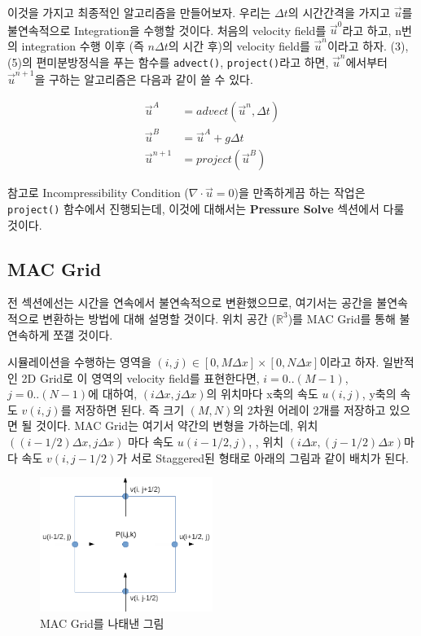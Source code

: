 \documentclass[12pt, A4]{article}
\begin{document}
이것을 가지고 최종적인 알고리즘을 만들어보자.
우리는 $\Delta t$의 시간간격을 가지고 $\vec{u}$를 불연속적으로 Integration을 수행할 것이다. 처음의 velocity field를 $\vec{u}^0$라고 하고, n번의 integration 수행 이후 (즉 $n \Delta t$의 시간 후)의 velocity field를 $\vec{u}^n$이라고 하자. (3), (5)의 편미분방정식을 푸는 함수를 \texttt{advect()}, \texttt{project()}라고 하면, $\vec{u}^n$에서부터 $\vec{u}^{n+1}$을 구하는 알고리즘은 다음과 같이 쓸 수 있다. \cite[p.20]{fluid-sim-cg}

\begin{align}
  \vec{u}^A &= advect(\vec{u}^n, \Delta t) \\
  \vec{u}^B &= \vec{u}^A + g \Delta t \\
  \vec{u}^{n+1} &= project(\vec{u}^B)
\end{align}

참고로 Incompressibility Condition ($\nabla \cdot \vec{u} = 0$)을 만족하게끔 하는 작업은 \texttt{project()} 함수에서 진행되는데, 이것에 대해서는 \textbf{Pressure Solve} 섹션에서 다룰 것이다.

\subsection{MAC Grid}

전 섹션에선는 시간을 연속에서 불연속적으로 변환했으므로, 여기서는 공간을 불연속적으로 변환하는 방법에 대해 설명할 것이다. 위치 공간 ($\mathbb{R}^3$)를 MAC Grid를 통해 불연속하게 쪼갤 것이다. \cite[p.21-25]{fluid-sim-cg}

시뮬레이션을 수행하는 영역을 $(i, j) \in [0, M \Delta x] \times [0, N \Delta x]$이라고 하자. 일반적인 2D Grid로 이 영역의 velocity field를 표현한다면, $i = 0..(M-1)$, $j = 0..(N-1)$에 대하여,  $(i \Delta x, j \Delta x)$의 위치마다 x축의 속도 $u(i, j)$, y축의 속도 $v(i, j)$를 저장하면 된다. 즉 크기 $(M, N)$의 2차원 어레이 2개를 저장하고 있으면 될 것이다. MAC Grid는 여기서 약간의 변형을 가하는데, 위치 $((i-1/2) \Delta x, j \Delta x)$ 마다 속도 $u(i-1/2, j)$, , 위치 $(i \Delta x, (j-1/2) \Delta x)$마다 속도 $v(i,j-1/2)$가 서로 Staggered된 형태로 아래의 그림과 같이 배치가 된다.

\begin{figure}[h]
\centering
\includegraphics[width=0.5\textwidth]{mac_grid}
\caption{MAC Grid를 나태낸 그림}
\end{figure}
\end{document}
